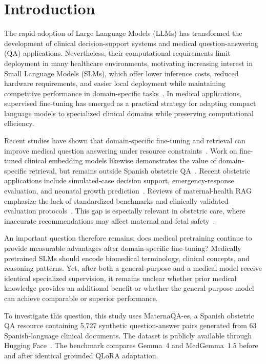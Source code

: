 \section{Introduction}
The rapid adoption of Large Language Models (LLMs) has transformed the
development of clinical decision-support systems and medical
question-answering (QA) applications. Nevertheless, their computational
requirements limit deployment in many healthcare environments, motivating
increasing interest in Small Language Models (SLMs), which offer lower
inference costs, reduced hardware requirements, and easier local
deployment while maintaining competitive performance in domain-specific
tasks~\cite{pingua2025medical,gemma2024}. In medical applications,
supervised fine-tuning has emerged as a practical strategy for adapting
compact language models to specialized clinical domains while preserving
computational efficiency.

Recent studies have shown that domain-specific fine-tuning and retrieval
can improve medical question answering under resource
constraints~\cite{bora2024systematic}. Work on fine-tuned clinical
embedding models likewise demonstrates the value of domain-specific
retrieval, but remains outside Spanish obstetric QA~\cite{arzideh2026improving}.
Recent obstetric applications include simulated-case decision support,
emergency-response evaluation, and neonatal growth
prediction~\cite{psilopatis2026role,arslan2025evaluation,xu2026obstet}.
Reviews of maternal-health RAG emphasize the lack of standardized
benchmarks and clinically validated evaluation
protocols~\cite{noguera2025applications}. This gap is especially relevant
in obstetric care, where inaccurate recommendations may affect maternal
and fetal safety~\cite{pacheco2023inteligencia}.

An important question therefore remains: does medical pretraining continue
to provide measurable advantages after domain-specific fine-tuning?
Medically pretrained SLMs should encode biomedical terminology, clinical
concepts, and reasoning patterns. Yet, after both a general-purpose and a
medical model receive identical specialized supervision, it remains unclear
whether prior medical knowledge provides an additional benefit or whether
the general-purpose model can achieve comparable or superior performance.

To investigate this question, this study uses MaternaQA-es, a Spanish
obstetric QA resource containing 5,727 synthetic question-answer pairs
generated from 63 Spanish-language clinical documents. The dataset is
publicly available through
Hugging Face~\cite{maternaqa2026}. The benchmark compares Gemma~4 and
MedGemma~1.5 before and after identical grounded QLoRA adaptation.

